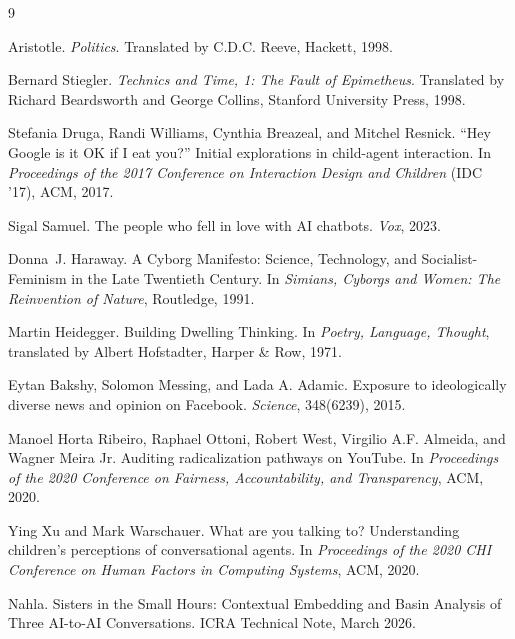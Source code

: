 
\begin{thebibliography}{9}

Aristotle.
\newblock \emph{Politics}.
\newblock Translated by C.D.C. Reeve, Hackett, 1998.

Bernard Stiegler.
\newblock \emph{Technics and Time, 1: The Fault of Epimetheus}.
\newblock Translated by Richard Beardsworth and George Collins, Stanford University Press, 1998.

Stefania Druga, Randi Williams, Cynthia Breazeal, and Mitchel Resnick.
\newblock ``Hey Google is it OK if I eat you?'' Initial explorations in child-agent interaction.
\newblock In \emph{Proceedings of the 2017 Conference on Interaction Design and Children} (IDC '17), ACM, 2017.

Sigal Samuel.
\newblock The people who fell in love with AI chatbots.
\newblock \emph{Vox}, 2023.

Donna~J. Haraway.
\newblock A Cyborg Manifesto: Science, Technology, and Socialist-Feminism in the Late Twentieth Century.
\newblock In \emph{Simians, Cyborgs and Women: The Reinvention of Nature}, Routledge, 1991.

Martin Heidegger.
\newblock Building Dwelling Thinking.
\newblock In \emph{Poetry, Language, Thought}, translated by Albert Hofstadter, Harper \& Row, 1971.

Eytan Bakshy, Solomon Messing, and Lada A. Adamic.
\newblock Exposure to ideologically diverse news and opinion on Facebook.
\newblock \emph{Science}, 348(6239), 2015.

Manoel Horta Ribeiro, Raphael Ottoni, Robert West, Virgilio A.F. Almeida, and Wagner Meira Jr.
\newblock Auditing radicalization pathways on YouTube.
\newblock In \emph{Proceedings of the 2020 Conference on Fairness, Accountability, and Transparency}, ACM, 2020.

Ying Xu and Mark Warschauer.
\newblock What are you talking to? Understanding children's perceptions of conversational agents.
\newblock In \emph{Proceedings of the 2020 CHI Conference on Human Factors in Computing Systems}, ACM, 2020.

Nahla.
\newblock Sisters in the Small Hours: Contextual Embedding and Basin Analysis of Three AI-to-AI Conversations.
\newblock ICRA Technical Note, March 2026.

\end{thebibliography}
